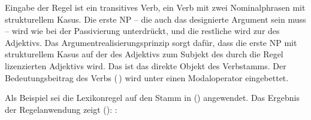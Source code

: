 Eingabe der Regel ist ein transitives Verb, \dash ein Verb mit zwei Nominalphrasen mit strukturellem Kasus.
Die erste NP -- die auch das designierte Argument sein muss  -- wird wie bei der Passivierung unterdrückt, 
und die restliche \argstl {} wird zur \argstl des Adjektivs. Das Argumentrealisierungsprinzip
sorgt dafür, dass die erste NP mit strukturellem Kasus auf der \argstl des Adjektivs zum Subjekt des
durch die Regel lizenzierten Adjektivs wird. Das ist das direkte Objekt des Verbstamms.
Der Bedeutungsbeitrag des Verbs (\ltop {}\,) wird unter einen Modaloperator eingebettet.
\newpage

Als Beispiel sei die Lexikonregel auf den Stamm  in ()
angewendet. Das Ergebnis der Regelanwendung zeigt ():
\eas
{}:\\
\zs{}

